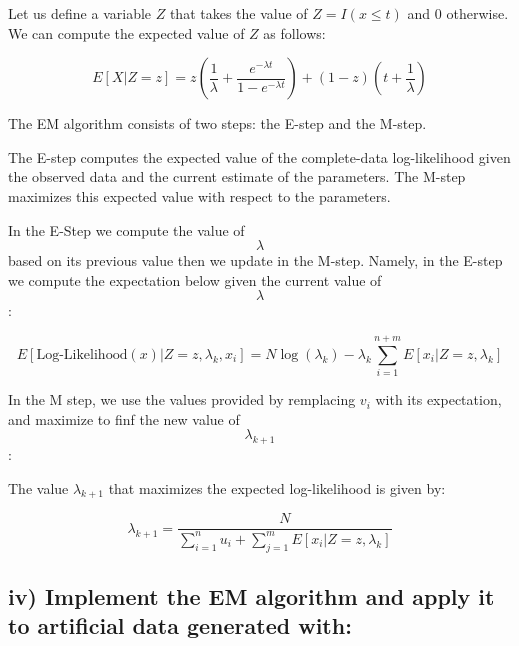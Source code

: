 \documentclass[
]{article}
\begin{document}
Let us define a variable \(Z\) that takes the value of
\(Z = I(x \leq t)\) and 0 otherwise. We can compute the expected value
of \(Z\) as follows:

\[E[X | Z = z] =   z\left( \frac{1}{\lambda} + \frac{e^{-\lambda t}}{1 - e^{-\lambda t}} \right) + (1-z)(t + \frac{1}{\lambda}) \]

The EM algorithm consists of two steps: the E-step and the M-step.

The E-step computes the expected value of the complete-data
log-likelihood given the observed data and the current estimate of the
parameters. The M-step maximizes this expected value with respect to the
parameters.

In the E-Step we compute the value of \[ \lambda \] based on its
previous value then we update in the M-step. Namely, in the E-step we
compute the expectation below given the current value of \[ \lambda \]:

\[ E[\text{Log-Likelihood}(x)|Z = z,\lambda_{k}, x_{i}] =  N\log(\lambda_{k}) - \lambda_{k} \sum_{i=1}^{n+m}E[x_{i}| Z = z,\lambda_{k}] \]

In the M step, we use the values provided by remplacing \(v_{i}\) with
its expectation, and maximize to finf the new value of
\[ \lambda_{k+1} \]:

The value \(\lambda_{k+1}\) that maximizes the expected log-likelihood
is given by:

\[ \lambda_{k+1} = \frac{N}{\sum_{i=1}^{n}u_{i} + \sum_{j=1}^{m}E[x_{i}|Z = z,\lambda_{k}]} \]

\subsection{iv) Implement the EM algorithm and apply it to artificial
data generated
with:}\label{iv-implement-the-em-algorithm-and-apply-it-to-artificial-data-generated-with}
\end{document}
